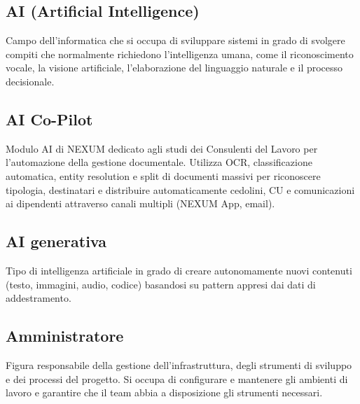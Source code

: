 \documentclass[a4paper,11pt]{article}
\begin{document}
\subsection{AI (Artificial Intelligence)}
Campo dell'informatica che si occupa di sviluppare sistemi in grado di svolgere compiti che normalmente richiedono l'intelligenza umana, come il riconoscimento vocale, la visione artificiale, l'elaborazione del linguaggio naturale e il processo decisionale.









\subsection{AI Co-Pilot}
Modulo AI di NEXUM dedicato agli studi dei Consulenti del Lavoro per l'automazione della gestione documentale. Utilizza OCR, classificazione automatica, entity resolution e split di documenti massivi per riconoscere tipologia, destinatari e distribuire automaticamente cedolini, CU e comunicazioni ai dipendenti attraverso canali multipli (NEXUM App, email).









\subsection{AI generativa}
Tipo di intelligenza artificiale in grado di creare autonomamente nuovi contenuti (testo, immagini, audio, codice) basandosi su pattern appresi dai dati di addestramento.









\subsection{Amministratore}
Figura responsabile della gestione dell'infrastruttura, degli strumenti di sviluppo e dei processi del progetto. Si occupa di configurare e mantenere gli ambienti di lavoro e garantire che il team abbia a disposizione gli strumenti necessari.
\end{document}
